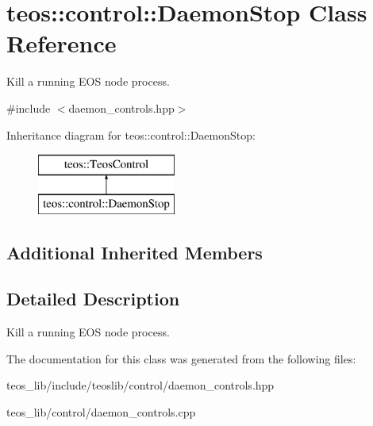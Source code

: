 \hypertarget{classteos_1_1control_1_1_daemon_stop}{}\section{teos\+:\+:control\+:\+:Daemon\+Stop Class Reference}
\label{classteos_1_1control_1_1_daemon_stop}


Kill a running E\+OS node process.  




{\ttfamily \#include $<$daemon\+\_\+controls.\+hpp$>$}

Inheritance diagram for teos\+:\+:control\+:\+:Daemon\+Stop\+:\begin{figure}[H]
\begin{center}
\leavevmode
\includegraphics[height=2.000000cm]{classteos_1_1control_1_1_daemon_stop}
\end{center}
\end{figure}
\subsection*{Additional Inherited Members}


\subsection{Detailed Description}
Kill a running E\+OS node process. 

The documentation for this class was generated from the following files\+:\begin{DoxyCompactItemize}
\item 
teos\+\_\+lib/include/teoslib/control/daemon\+\_\+controls.\+hpp\item 
teos\+\_\+lib/control/daemon\+\_\+controls.\+cpp\end{DoxyCompactItemize}
